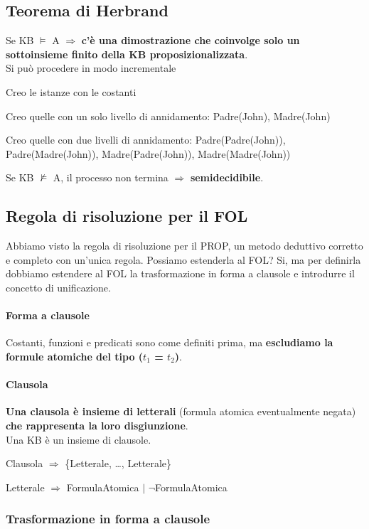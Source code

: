 \documentclass[10pt]{book}
\begin{document}
\subsection{Teorema di Herbrand}
Se KB $\vDash$ A $\Rightarrow$ \textbf{c'è una dimostrazione che coinvolge solo un sottoinsieme finito della KB proposizionalizzata}.\\
Si può procedere in modo incrementale
\begin{list}{}{}
	\item Creo le istanze con le costanti
	\item Creo quelle con un solo livello di annidamento: Padre(John), Madre(John)
	\item Creo quelle con due livelli di annidamento: Padre(Padre(John)), Padre(Madre(John)), Madre(Padre(John)), Madre(Madre(John))
\end{list}
Se KB $\not\vDash$ A, il processo non termina $\Rightarrow$ \textbf{semidecidibile}.
\subsection{Regola di risoluzione per il FOL}
Abbiamo visto la regola di risoluzione per il PROP, un metodo deduttivo corretto e completo con un'unica regola. Possiamo estenderla al FOL? Si, ma per definirla dobbiamo estendere al FOL la trasformazione in forma a clausole e introdurre il concetto di unificazione.
\pagebreak
\paragraph{Forma a clausole}
Costanti, funzioni e predicati sono come definiti prima, ma \textbf{escludiamo la formule atomiche del tipo ($t_1$ = $t_2$)}.
\paragraph{Clausola} \textbf{Una clausola è insieme di letterali} (formula atomica eventualmente negata) \textbf{che rappresenta la loro disgiunzione}.\\
Una KB è un insieme di clausole.
\begin{list}{}{}
	\item Clausola $\Rightarrow$ \{Letterale, \ldots, Letterale\}
	\item Letterale $\Rightarrow$ FormulaAtomica $|$ $\neg$FormulaAtomica
\end{list}
\subsubsection{Trasformazione in forma a clausole}
\end{document}

